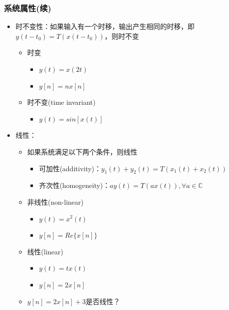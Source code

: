 \documentclass[CJKutf8,dvipsnames,table]{beamer}
\begin{document}
\begin{CJK*}{UTF8}{song}
  \begin{frame}
    \frametitle{系统属性(续)}
    \begin{itemize}
    \item 时不变性：如果输入有一个时移，输出产生相同的时移，即$y(t-t_0)=T(x(t-t_0))$，则时不变
        \begin{itemize}
        \item 时变
            \begin{itemize}
            \item $y(t)=x(2t)$
            \item $y[n]=nx[n]$
            \end{itemize}
        \item 时不变(time invariant)    
            \begin{itemize}
            \item $y(t)=sin[x(t)]$
            \end{itemize}
        \end{itemize}        
    \item 线性：
          \begin{itemize}
          \item 如果系统满足以下两个条件，则线性
          \begin{itemize}
          \item 可加性(additivity)：$y_1(t)+y_2(t)=T(x_1(t)+x_2(t))$
          \item 齐次性(homogeneity)：$ay(t)=T(ax(t)), \forall a \in \mathbb{C}$
         \end{itemize}
          \end{itemize}
        \begin{itemize}
        \item 非线性(non-linear)
            \begin{itemize}
            \item $y(t)=x^2(t)$
            \item $y[n]=Re\{x[n]\}$
            \end{itemize}
        \item 线性(linear)    
            \begin{itemize}
            \item $y(t)=tx(t)$
            \item $y[n]=2x[n]$
            \end{itemize}
        \item $y[n]=2x[n]+3$是否线性？
        \end{itemize}  
    \end{itemize} 
  \end{frame}
        

\end{CJK*}
\end{document}
